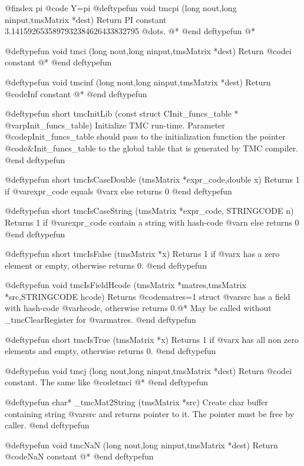 @findex pi 
@code{   Y=pi    }
@deftypefun void tmcpi  (long nout,long ninput,tmsMatrix *dest)
Return PI constant 3.1415926535897932384626433832795 @dots{}. @*
@end deftypefun
@*



@deftypefun    void tmci (long nout,long ninput,tmsMatrix *dest) 
Return @code{i} constant @*
@end deftypefun


@deftypefun  void tmcinf (long nout,long ninput,tmsMatrix *dest)
Return @code{Inf} constant @*
@end deftypefun



@deftypefun short tmcInitLib (const struct CInit_funcs_table *  @var{pInit_funcs_table})
Initialize TMC run-time. Parameter @code{pInit_funcs_table}  should pass to the initialization function the pointer @code{&Init_funcs_table} to the global table that is generated by TMC compiler. 
@end deftypefun



@deftypefun  short tmcIsCaseDouble (tmsMatrix *expr_code,double x) 
Returns 1 if @var{expr_code} equals @var{x} else returns 0
@end deftypefun



@deftypefun   short tmcIsCaseString (tmsMatrix *expr_code, STRINGCODE n)
Returns 1 if @var{expr_code} contain a string with hash-code @var{n} else returns 0
@end deftypefun


@deftypefun    short  tmcIsFalse (tmsMatrix *x)
Returns  1 if @var{x} has a zero element or empty, otherwise returns 0.
@end deftypefun


@deftypefun  void tmcIsFieldHcode (tmsMatrix *matres,tmsMatrix *src,STRINGCODE hcode) 
Returns  @code{matres=1} struct @var{src} has a field with hash-code @var{hcode}, otherwise returns 0.@*
May be  called without _tmcClearRegister for @var{matres}.
@end deftypefun


@deftypefun  short  tmcIsTrue (tmsMatrix *x)
Returns  1 if @var{x} has all non zero elements and empty, otherwise returns 0.
@end deftypefun


@deftypefun    void tmcj (long nout,long ninput,tmsMatrix *dest)
Return @code{i} constant. The same like @code{tmci} @*
@end deftypefun




@deftypefun   char* _tmcMat2String (tmsMatrix *src)
Create char buffer containing string @var{src} and returns pointer to it. The pointer must be free by caller.
@end deftypefun

@deftypefun  void tmcNaN (long nout,long ninput,tmsMatrix *dest)
Return @code{NaN} constant @*
@end deftypefun




